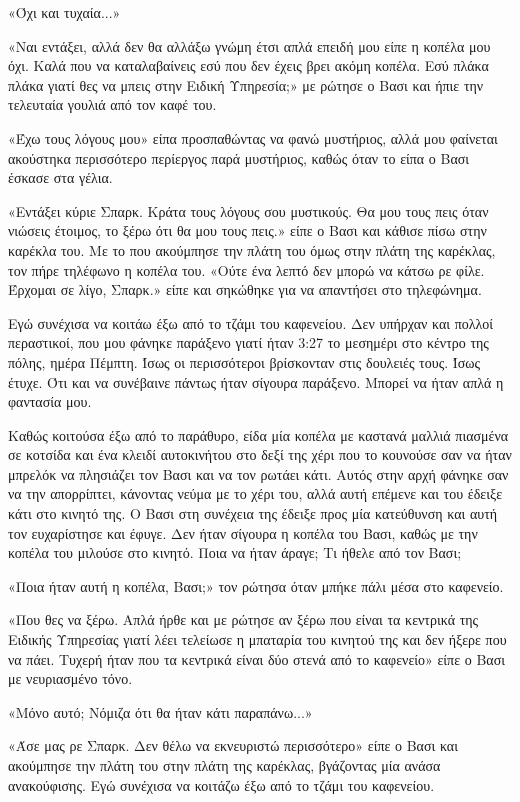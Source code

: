 \documentclass[12pt,twoside, openany]{book}
\begin{document}
«Όχι και τυχαία...»

«Ναι εντάξει, αλλά δεν θα αλλάξω γνώμη έτσι απλά επειδή μου είπε η κοπέλα μου όχι. Καλά που να καταλαβαίνεις εσύ που δεν έχεις βρει ακόμη κοπέλα. Εσύ πλάκα πλάκα γιατί θες να μπεις στην Ειδική Υπηρεσία;» με ρώτησε ο Βασι και ήπιε την τελευταία γουλιά από τον καφέ του.

«Έχω τους λόγους μου» είπα προσπαθώντας να φανώ μυστήριος, αλλά μου φαίνεται ακούστηκα περισσότερο περίεργος παρά μυστήριος, καθώς όταν το είπα ο Βασι έσκασε στα γέλια.

«Εντάξει κύριε Σπαρκ. Κράτα τους λόγους σου μυστικούς. Θα μου τους πεις όταν νιώσεις έτοιμος, το ξέρω ότι θα μου τους πεις.» είπε ο Βασι και κάθισε πίσω στην καρέκλα του. Με το που ακούμπησε την πλάτη του όμως στην πλάτη της καρέκλας, τον πήρε τηλέφωνο η κοπέλα του. «Ούτε ένα λεπτό δεν μπορώ να κάτσω ρε φίλε. Έρχομαι σε λίγο, Σπαρκ.» είπε και σηκώθηκε για να απαντήσει στο τηλεφώνημα.

Εγώ συνέχισα να κοιτάω έξω από το τζάμι του καφενείου. Δεν υπήρχαν και πολλοί περαστικοί, που μου φάνηκε παράξενο γιατί ήταν 3:27 το μεσημέρι στο κέντρο της πόλης, ημέρα Πέμπτη. Ίσως οι περισσότεροι βρίσκονταν στις δουλειές τους. Ίσως έτυχε. Ότι και να συνέβαινε πάντως ήταν σίγουρα παράξενο. Μπορεί να ήταν απλά η φαντασία μου. 

Καθώς κοιτούσα έξω από το παράθυρο, είδα μία κοπέλα με καστανά μαλλιά πιασμένα σε κοτσίδα και ένα κλειδί αυτοκινήτου στο δεξί της χέρι που το κουνούσε σαν να ήταν μπρελόκ να πλησιάζει τον Βασι και να τον ρωτάει κάτι. Αυτός στην αρχή φάνηκε σαν να την απορρίπτει, κάνοντας νεύμα με το χέρι του, αλλά αυτή επέμενε και του έδειξε κάτι στο κινητό της. Ο Βασι στη συνέχεια της έδειξε προς μία κατεύθυνση και αυτή τον ευχαρίστησε και έφυγε. Δεν ήταν σίγουρα η κοπέλα του Βασι, καθώς με την κοπέλα του μιλούσε στο κινητό. Ποια να ήταν άραγε; Τι ήθελε από τον Βασι;

«Ποια ήταν αυτή η κοπέλα, Βασι;» τον ρώτησα όταν μπήκε πάλι μέσα στο καφενείο.

«Που θες να ξέρω. Απλά ήρθε και με ρώτησε αν ξέρω που είναι τα κεντρικά της Ειδικής Υπηρεσίας γιατί λέει τελείωσε η μπαταρία του κινητού της και δεν ήξερε που να πάει. Τυχερή ήταν που τα κεντρικά είναι δύο στενά από το καφενείο» είπε ο Βασι με νευριασμένο τόνο.

«Μόνο αυτό; Νόμιζα ότι θα ήταν κάτι παραπάνω...»

«Άσε μας ρε Σπαρκ. Δεν θέλω να εκνευριστώ περισσότερο» είπε ο Βασι και ακούμπησε την πλάτη του στην πλάτη της καρέκλας, βγάζοντας μία ανάσα ανακούφισης. Εγώ συνέχισα να κοιτάζω έξω από το τζάμι του καφενείου.
\end{document}
